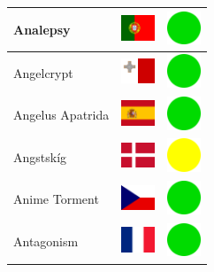 \documentclass[12pt, a4paper, twoside]{report}
\begin{document}
\begin{center}
\begin{longtable}{|p{5cm}|p{2cm}|p{2cm}|}
Analepsy & \includegraphics[width=1cm]{4x3/pt} & \includegraphics[width=1cm]{likes/y} \\ \hline
Angelcrypt & \includegraphics[width=1cm]{4x3/mt} & \includegraphics[width=1cm]{likes/y} \\ \hline
Angelus Apatrida & \includegraphics[width=1cm]{4x3/es} & \includegraphics[width=1cm]{likes/y} \\ \hline
Angstskíg & \includegraphics[width=1cm]{4x3/dk} & \includegraphics[width=1cm]{likes/m} \\ \hline
Anime Torment & \includegraphics[width=1cm]{4x3/cz} & \includegraphics[width=1cm]{likes/y} \\ \hline
Antagonism & \includegraphics[width=1cm]{4x3/fr} & \includegraphics[width=1cm]{likes/y} \\ \hline

\end{longtable}
\end{center}
\end{document}
